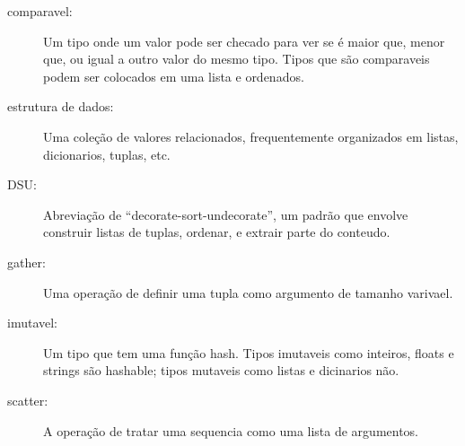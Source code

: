 \begin{description}

\item[comparavel:] Um tipo onde um valor pode ser checado para ver se é
maior que, menor que, ou igual a outro valor do mesmo tipo.
Tipos que são comparaveis podem ser colocados em uma lista e ordenados.

\item[estrutura de dados:] Uma coleção de valores relacionados, 
frequentemente organizados em listas, dicionarios, tuplas, etc.

\item[DSU:] Abreviação de ``decorate-sort-undecorate'', um
padrão que envolve construir listas de tuplas, ordenar, e 
extrair parte do conteudo.

\item[gather:] Uma operação de definir uma tupla como argumento 
de tamanho varivael.

\item[imutavel:] Um tipo que tem uma função hash. Tipos imutaveis
como inteiros,
floats e strings são hashable; tipos mutaveis como listas e
dicinarios não.

\item[scatter:] A operação de tratar uma sequencia como uma lista de
argumentos.


\end{description}
